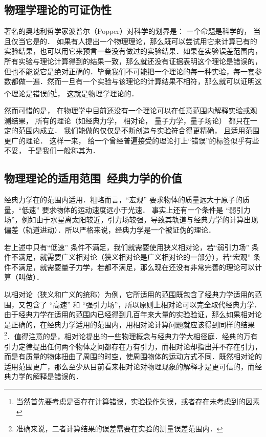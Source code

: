 

\subsection{物理学理论的可证伪性}

著名的奥地利哲学家波普尔（Popper）对科学的划界是： 一个命题是科学的， 当且仅当它是的． 如果有人提出一个物理理论，那么既可以尝试用它来计算已有的实验结果，也可以用它来预言一些没有做过的实验结果．如果在实验误差范围内，所有实验与理论计算得到的结果一致，那么就还没有证据表明这个理论是错误的，但也不能说它是绝对正确的．毕竟我们不可能把一个理论的每一种实验，每一套参数都做一遍．然而一旦有一个实验与该理论的计算结果不相符，那么就可以证明这个理论是错误的\footnote{当然首先要考虑是否存在计算错误，实验操作失误，或者存在未考虑到的因素}， 这就是物理学理论的．

然而可惜的是， 在物理学中目前还没有一个理论可以在任意范围内解释实验或观测结果， 所有的理论（如经典力学， 相对论， 量子力学，量子场论） 都只在一定的范围内成立． 我们能做的仅仅是不断创造与实验符合得更精确， 且适用范围更广的理论． 这样一来， 给一个曾经普遍接受的理论打上“错误”的标签似乎有些不妥， 于是我们一般称其为．


\subsection{物理理论的适用范围\ 经典力学的价值}

经典力学在的范围内适用．粗略而言，“宏观” 要求物体的质量远大于原子的质量，“低速” 要求物体的运动速度远小于光速． 事实上还有一个条件是 “弱引力场”，例如由于水星离太阳较近，引力场较强，导致其轨道与经典力学的计算出现偏差（轨道进动）．所以严格来说，经典力学是一个被证伪的理论．

若上述中只有“低速” 条件不满足，我们就需要使用狭义相对论，若“弱引力场” 条件不满足，就需要广义相对论（狭义相对论是广义相对论的一部分），若“宏观” 条件不满足，就需要量子力学，若都不满足，那么现在还没有非常完善的理论可以计算（叫做）．

以相对论（狭义和广义的统称）为例，它所适用的范围既包含了经典力学适用的范围，又包含了 “高速” 和 “强引力场”，所以原则上相对论可以完全取代经典力学．由于经典力学在适用的范围内已经得到几百年来大量的实验验证，那么如果相对论是正确的，在经典力学适用的范围内，用相对论计算问题就应该得到同样的结果\footnote{准确来说，二者计算结果的误差需要在实验的测量误差范围内．}．值得注意的是，相对论提出的一些物理概念与经典力学大相径庭．经典的万有引力定律提出任何两个物体之间都存在万有引力，而相对论却指出并不存在引力，而是有质量的物体扭曲了周围的时空，使周围物体的运动方式不同．既然相对论的适用范围更广，那么至少从目前看来相对论对物理现象的解释才是更可信的，而经典力学的解释是错误的． 

